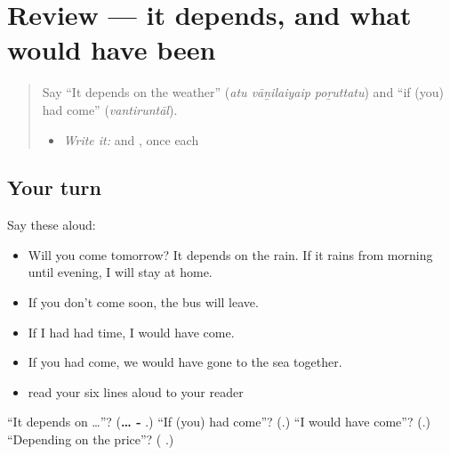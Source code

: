 \section[(review)]{Review — it depends, and what would have been}

\label{lesson:TA-R293-depends-and-would}



\begin{quote}
Say \textquotedblleft{}It depends on the weather\textquotedblright{} (\emph{atu vāṉilaiyaip poṟuttatu}) and \textquotedblleft{}if (you) had come\textquotedblright{} (\emph{vantiruntāl}).

\begin{itemize}
\raggedright
  \item \emph{Write it:} \textbf{} and \textbf{}, once each
\end{itemize}
\end{quote}

\subsection*{Your turn}
Say these aloud:

\begin{itemize}
\raggedright
  \item Will you come tomorrow? It depends on the rain. If it rains from morning until evening, I will stay at home.
  \item If you don't come soon, the bus will leave.
  \item If I had had time, I would have come.
  \item If you had come, we would have gone to the sea together.
  \item read your six lines aloud to your reader
\end{itemize}

\begin{tcolorbox}[breakable,colback=teal!4,colframe=teal!35!black,title={Before you move on}]
\textquotedblleft{}It depends on …\textquotedblright{}? (\textbf{… - }.) \textquotedblleft{}If (you) had come\textquotedblright{}? (\textbf{}.) \textquotedblleft{}I would have come\textquotedblright{}? (\textbf{}.) \textquotedblleft{}Depending on the price\textquotedblright{}? (\textbf{ }.)
\end{tcolorbox}
